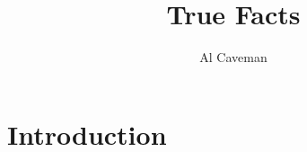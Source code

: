 \documentclass{report}
\title{\Huge\sc True Facts}
\author{Al Caveman}
\begin{document}
\maketitle
\tableofcontents

\chapter{Introduction}
\end{document}
